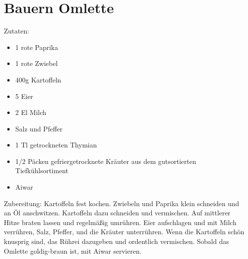 \section{Bauern Omlette}
Zutaten:
\begin{itemize}
    \item 1 rote Paprika
    \item 1 rote Zwiebel
    \item 400g Kartoffeln
    \item 5 Eier
    \item 2 El Milch
    \item Salz und Pfeffer
    \item 1 Tl getrockneten Thymian
    \item 1/2 Päcken gefriergetrocknete Kräuter aus dem gutsortierten Tiefkühlsortiment
    \item Aiwar
\end{itemize}

Zubereitung:
Kartoffeln fest kochen. Zwiebeln und Paprika klein schneiden und an Öl anschwitzen. Kartoffeln dazu schneiden und vermischen. Auf mittlerer Hitze braten lassen und regelmäßig umrühren. Eier aufschlagen und mit Milch verrühren, Salz, Pfeffer, und die Kräuter unterrühren. Wenn die Kartoffeln schön knusprig sind, das Rührei dazugeben und ordentlich vermischen. Sobald das Omlette goldig-braun ist, mit Aiwar servieren.

\newpage
\mbox{}
\vfill
\begin{center}
\end{center}
\vfill
\mbox{ }
\newpage
